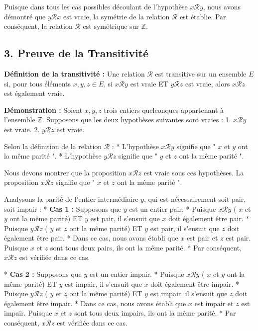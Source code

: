 \documentclass{report}
\begin{document}
Puisque dans tous les cas possibles découlant de l'hypothèse $x \mathcal{R} y$, nous avons démontré que $y \mathcal{R} x$ est vraie, la symétrie de la relation $\mathcal{R}$ est établie.
Par conséquent, la relation $\mathcal{R}$ est symétrique sur $\mathbb{Z}$.

\subsection*{3. Preuve de la Transitivité}

\textbf{Définition de la transitivité :} Une relation $\mathcal{R}$ est transitive sur un ensemble $E$ si, pour tous éléments $x, y, z \in E$, si $x \mathcal{R} y$ est vraie ET $y \mathcal{R} z$ est vraie, alors $x \mathcal{R} z$ est également vraie.

\textbf{Démonstration :}
Soient $x, y, z$ trois entiers quelconques appartenant à l'ensemble $\mathbb{Z}$.
Supposons que les deux hypothèses suivantes sont vraies :
1.  $x \mathcal{R} y$ est vraie.
2.  $y \mathcal{R} z$ est vraie.

Selon la définition de la relation $\mathcal{R}$ :
*   L'hypothèse $x \mathcal{R} y$ signifie que " $x$ et $y$ ont la même parité ".
*   L'hypothèse $y \mathcal{R} z$ signifie que " $y$ et $z$ ont la même parité ".

Nous devons montrer que la proposition $x \mathcal{R} z$ est vraie sous ces hypothèses.
La proposition $x \mathcal{R} z$ signifie que " $x$ et $z$ ont la même parité ".

Analysons la parité de l'entier intermédiaire $y$, qui est nécessairement soit pair, soit impair :
*   \textbf{Cas 1 :} Supposons que $y$ est un entier pair.
    *   Puisque $x \mathcal{R} y$ ( $x$ et $y$ ont la même parité) ET $y$ est pair, il s'ensuit que $x$ doit également être pair.
    *   Puisque $y \mathcal{R} z$ ( $y$ et $z$ ont la même parité) ET $y$ est pair, il s'ensuit que $z$ doit également être pair.
    *   Dans ce cas, nous avons établi que $x$ est pair et $z$ est pair. Puisque $x$ et $z$ sont tous deux pairs, ils ont la même parité.
    *   Par conséquent, $x \mathcal{R} z$ est vérifiée dans ce cas.

*   \textbf{Cas 2 :} Supposons que $y$ est un entier impair.
    *   Puisque $x \mathcal{R} y$ ( $x$ et $y$ ont la même parité) ET $y$ est impair, il s'ensuit que $x$ doit également être impair.
    *   Puisque $y \mathcal{R} z$ ( $y$ et $z$ ont la même parité) ET $y$ est impair, il s'ensuit que $z$ doit également être impair.
    *   Dans ce cas, nous avons établi que $x$ est impair et $z$ est impair. Puisque $x$ et $z$ sont tous deux impairs, ils ont la même parité.
    *   Par conséquent, $x \mathcal{R} z$ est vérifiée dans ce cas.
\end{document}
